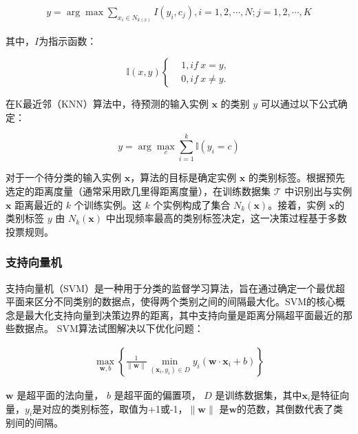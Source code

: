 \documentclass[a4paper, 10pt]{article}
\begin{document}
	\begin{equation}
		\begin{aligned}
			y = \arg\max \sum_{x_i \in N_{k(x)}} I \left(y_i, c_j\right), i = 1,2, \cdots, N; j = 1,2, \cdots, K
		\end{aligned}
		\label{eq: knn}
	\end{equation}
	
	其中，$I$为指示函数：
	
	\begin{equation}
		\mathbb{I} \left( x,y\right)
		\left\{
		\begin{aligned}
			&1, if \ x=y ,\\
			&0, if \ x\neq y.
		\end{aligned}
		\right.
	\end{equation}
	
	在K最近邻（KNN）算法中，待预测的输入实例 $\mathbf{x}$ 的类别 $y$ 可以通过以下公式确定：
	
	\begin{equation}
		y = \arg\max_{c} \sum_{i=1}^{k} \mathbb{I} (y_i = c)
	\end{equation}
	
	对于一个待分类的输入实例 $\mathbf{x}$，算法的目标是确定实例 $\mathbf{x}$ 的类别标签。根据预先选定的距离度量（通常采用欧几里得距离度量），在训练数据集 $\mathcal{T}$ 中识别出与实例 $\mathbf{x}$ 距离最近的 $k$ 个训练实例。这 $k$ 个实例构成了集合 $N_k(\mathbf{x}) $。接着，实例 $\mathbf{x} $的类别标签 $y$ 由 $N_k(\mathbf{x})$ 中出现频率最高的类别标签决定，这一决策过程基于多数投票规则。
	
	
	\subsubsection{支持向量机}
	
	支持向量机（SVM）是一种用于分类的监督学习算法，旨在通过确定一个最优超平面来区分不同类别的数据点，使得两个类别之间的间隔最大化。SVM的核心概念是最大化支持向量到决策边界的距离，其中支持向量是距离分隔超平面最近的那些数据点。
	SVM算法试图解决以下优化问题：
	
	\begin{equation}
		\begin{aligned}
			\max_{\mathbf{w}, b} \left\{ \frac{1}{\|\mathbf{w}\|} \min_{(\mathbf{x}_i, y_i) \in D} y_i(\mathbf{w} \cdot \mathbf{x}_i + b) \right\}
		\end{aligned}
		\label{eq: svm}
	\end{equation}
	
	$\mathbf{w}$ 是超平面的法向量， $b$ 是超平面的偏置项， $D$ 是训练数据集，其中$\mathbf{x}_i$是特征向量，$y_i$是对应的类别标签，取值为+1或-1，$ \|\mathbf{w}\|$ 是$ \mathbf{w}$的范数，其倒数代表了类别间的间隔\cite{VALKENBORG2023754}。
	
\end{document}
